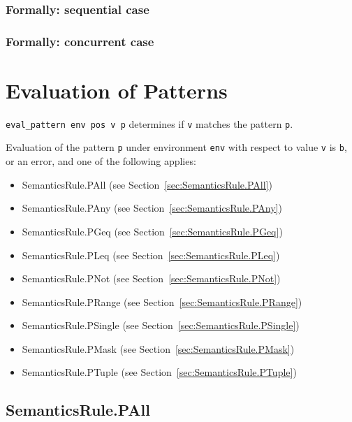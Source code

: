 \documentclass{book}
\begin{document}
\begin{emptyformal}
  \subsection{Formally: sequential case}

  \subsection{Formally: concurrent case}
\end{emptyformal}


\chapter{Evaluation of Patterns \label{chap:eval_pattern}}
\texttt{eval\_pattern env pos v p} determines if \texttt{v} matches the pattern \texttt{p}.

Evaluation of the pattern \texttt{p} under environment \texttt{env} with
respect to value \texttt{v} is \texttt{b}, or an error, and one of the
following applies:
\begin{itemize}
\item SemanticsRule.PAll (see Section~\ref{sec:SemanticsRule.PAll})
\item SemanticsRule.PAny (see Section~\ref{sec:SemanticsRule.PAny})
\item SemanticsRule.PGeq (see Section~\ref{sec:SemanticsRule.PGeq})
\item SemanticsRule.PLeq (see Section~\ref{sec:SemanticsRule.PLeq})
\item SemanticsRule.PNot (see Section~\ref{sec:SemanticsRule.PNot})
\item SemanticsRule.PRange (see Section~\ref{sec:SemanticsRule.PRange})
\item SemanticsRule.PSingle (see Section~\ref{sec:SemanticsRule.PSingle})
\item SemanticsRule.PMask (see Section~\ref{sec:SemanticsRule.PMask})
\item SemanticsRule.PTuple (see Section~\ref{sec:SemanticsRule.PTuple})
\end{itemize}

\section{SemanticsRule.PAll \label{sec:SemanticsRule.PAll}}
\end{document}
